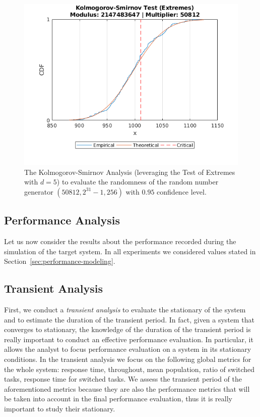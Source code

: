 \begin{figure}
	\includegraphics[width=\columnwidth]{fig/evaluation-randomness-kolmogorov-smirnov-50812}
	\caption{The Kolmogorov-Smirnov Analysis (leveraging the Test of Extremes with $d=5$) to evaluate the randomness of the random number generator $(50812,2^{31}-1, 256)$ with $0.95$ confidence level.}
	\label{fig:evaluation-randomness-kolmogorov-smirnov-50812}
\end{figure}


\subsection{Performance Analysis}
Let us now consider the results about the performance recorded during the simulation of the target system.
In all experiments we considered values stated in Section~\ref{sec:performance-modeling}.

\subsection{Transient Analysis}
\label{sec:evaluation-transient-analysis}
First, we conduct a \textit{transient analysis} to evaluate the stationary of the system and to estimate the duration of the transient period.
%
In fact, given a system that converges to stationary, the knowledge of the duration of the transient period is really important to conduct an effective performance evaluation. In particular, it allows the analyst to focus performance evaluation on a system in its stationary conditions.
%
In the transient analysis we focus on the following global metrics for the whole system: response time, throughout, mean population, ratio of switched tasks, response time for switched tasks. 
%
We assess the transient period of the aforementioned metrics because they are also the performance metrics that will be taken into account in the final performance evaluation, thus it is really important to study their stationary.


